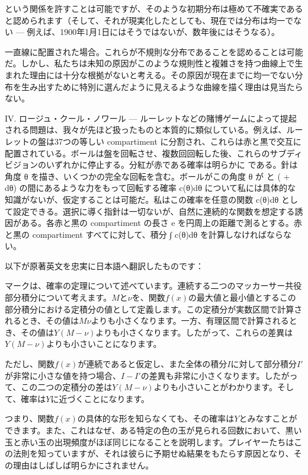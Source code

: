 \documentclass[a4paper,11pt,openany]{ltjsbook}
\begin{document}
という関係を許すことは可能ですが、そのような初期分布は極めて不確実であると認められます（そして、それが現実化したとしても、現在では分布は均一でない — 例えば、1900年1月1日にはそうではないが、数年後にはそうなる）。

一直線に配置された場合。これらが不規則な分布であることを認めることは可能だ。しかし、私たちは未知の原因がこのような規則性と複雑さを持つ曲線上で生まれた理由には十分な根拠がないと考える。その原因が現在までに均一でない分布を生み出すために特別に選んだように見えるような曲線を描く理由は見当たらない。

IV. ロージュ・クール・ノワール — ルーレットなどの賭博ゲームによって提起される問題は、我々が先ほど扱ったものと本質的に類似している。例えば、ルーレットの盤は37つの等しい compartiment に分割され、これらは赤と黒で交互に配置されている。ボールは盤を回転させ、複数回回転した後、これらのサブディビジョンのいずれかに停止する。分紅が赤である確率は明らかに  である。針は角度 θ を描き、いくつかの完全な回転を含む。ボールがこの角度 θ が  と ( + dθ) の間にあるような力をもって回転する確率 c(θ)dθ について私には具体的な知識がないが、仮定することは可能だ。私はこの確率を任意の関数 c(θ)dθ として設定できる。選択に導く指針は一切ないが、自然に連続的な関数を想定する誘因がある。各赤と黒の compartiment の長さ e を円周上の距離で測るとする。赤と黒の compartiment すべてに対して、積分 ∫ c(θ)dθ を計算しなければならない。

以下が原著英文を忠実に日本語へ翻訳したものです：

マークは、確率の定理について述べています。連続する二つのマッカーサー共役部分積分について考えます。$M$と$\nu$を、関数$f(x)$の最大値と最小値とするこの部分積分における定積分の値として定義します。この定積分が実数区間で計算されるとき、その値は$M\nu$よりも小さくなります。一方、有理区間で計算されるとき、その値は$Y(M-\nu)$よりも小さくなります。したがって、これらの差異は$Y(M-\nu)$よりも小さいことになります。

ただし、関数$f(x)$が連続であると仮定し、また全体の積分$I$に対して部分積分$I'$が非常に小さな値を持つ場合、$I-I'$の差異も非常に小さくなります。したがって、この二つの定積分の差は$Y(M-\nu)$よりも小さいことがわかります。そして、確率は$Y$に近づくことになります。

つまり、関数$f(x)$の具体的な形を知らなくても、その確率は$Y$とみなすことができます。また、これはなぜ、ある特定の色の玉が見られる回数において、黒い玉と赤い玉の出現頻度がほぼ同じになることを説明します。プレイヤーたちはこの法則を知っていますが、それは彼らに予期せぬ結果をもたらす原因となり、その理由はしばしば明らかにされません。
\end{document}
